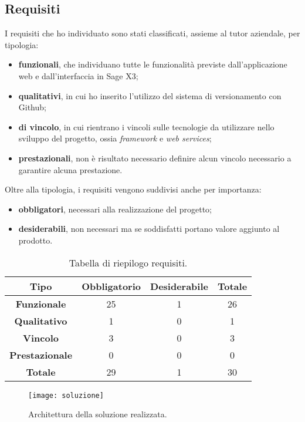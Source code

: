 \subsection{Requisiti}
I requisiti che ho individuato sono stati classificati, assieme al tutor aziendale, per tipologia:
\begin{itemize}
	\item \textbf{funzionali}, che individuano tutte le funzionalità previste dall'applicazione web e dall'interfaccia in Sage X3;
	\item \textbf{qualitativi}, in cui ho inserito l'utilizzo del sistema di versionamento con Github;
	\item \textbf{di vincolo}, in cui rientrano i vincoli sulle tecnologie da utilizzare nello sviluppo del progetto, ossia \textit{framework} e \textit{web services}; 
	\item \textbf{prestazionali}, non è risultato necessario definire alcun vincolo necessario a garantire alcuna prestazione.
\end{itemize}
Oltre alla tipologia, i requisiti vengono suddivisi anche per importanza:
\begin{itemize}
	\item \textbf{obbligatori}, necessari alla realizzazione del progetto;
	\item \textbf{desiderabili}, non necessari ma se soddisfatti portano valore aggiunto al prodotto.
\end{itemize}


\begin{center}
\begin{longtable}{ | c| c | c | c|}
	\caption{Tabella di riepilogo requisiti.}\\
	\hline
	\textbf{Tipo} & \textbf{Obbligatorio} & \textbf{Desiderabile} & \textbf{Totale}\\
	\hline
	\textbf{Funzionale} & 25 & 1 & 26 \\
	\hline
	\textbf{Qualitativo} & 1 & 0 & 1\\
	\hline
	\textbf{Vincolo} & 3 & 0 & 3 \\
	\hline
	\textbf{Prestazionale} & 0 & 0 & 0 \\
	\hline
	\textbf{Totale} & 29 & 1 & 30 \\
	\hline
\end{longtable}
\end{center}


\begin{figure}[htbp]
	\begin{center}
		\texttt{[image: soluzione]}
		\caption{Architettura della soluzione realizzata.}
	\end{center}
\end{figure}


